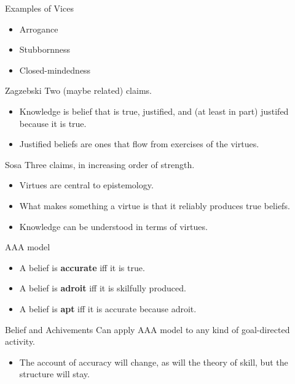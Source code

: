 \documentclass[
  17pt,
  letterpaper,
  ignorenonframetext,
  aspectratio=169,
]{beamer}
\providecommand{\tightlist}{%
  \setlength{\itemsep}{0pt}\setlength{\parskip}{0pt}}\usepackage{longtable,booktabs,array}
\begin{document}
\begin{frame}{Examples of Vices}
\protect\hypertarget{examples-of-vices}{}
\begin{itemize}[<+->]
\tightlist
\item
  Arrogance
\item
  Stubbornness
\item
  Closed-mindedness
\end{itemize}
\end{frame}

\begin{frame}{Zagzebski}
\protect\hypertarget{zagzebski-1}{}
Two (maybe related) claims.

\begin{itemize}[<+->]
\tightlist
\item
  Knowledge is belief that is true, justified, and (at least in part)
  justifed because it is true.
\item
  Justified beliefs are ones that flow from exercises of the virtues.
\end{itemize}
\end{frame}

\begin{frame}{Sosa}
\protect\hypertarget{sosa}{}
Three claims, in increasing order of strength.

\begin{itemize}[<+->]
\tightlist
\item
  Virtues are central to epistemology.
\item
  What makes something a virtue is that it reliably produces true
  beliefs.
\item
  Knowledge can be understood in terms of virtues.
\end{itemize}
\end{frame}

\begin{frame}{AAA model}
\protect\hypertarget{aaa-model}{}
\begin{itemize}[<+->]
\tightlist
\item
  A belief is \textbf{accurate} iff it is true.
\item
  A belief is \textbf{adroit} iff it is skilfully produced.
\item
  A belief is \textbf{apt} iff it is accurate because adroit.
\end{itemize}
\end{frame}

\begin{frame}{Belief and Achivements}
\protect\hypertarget{belief-and-achivements}{}
Can apply AAA model to any kind of goal-directed activity.

\begin{itemize}[<+->]
\tightlist
\item
  The account of accuracy will change, as will the theory of skill, but
  the structure will stay.
\end{itemize}
\end{frame}
\end{document}
